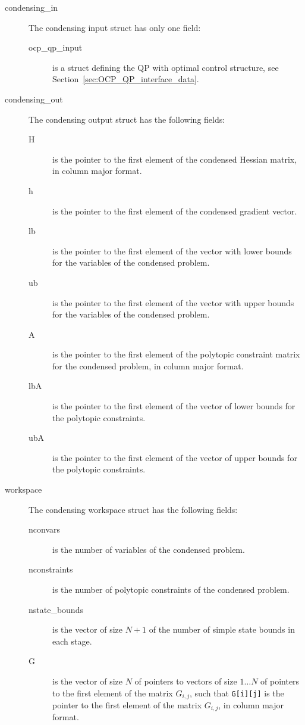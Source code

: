 \documentclass{report}
\begin{document}
\begin{description}
	\item[condensing\_in] The condensing input struct has only one field:
	\begin{description}
		\item[ocp\_qp\_input] is a struct defining the QP with optimal control structure, see Section~\ref{sec:OCP_QP_interface_data}.
	\end{description}
	\item[condensing\_out] The condensing output struct has the following fields:
	\begin{description}
		\item[H] is the pointer to the first element of the condensed Hessian matrix, in column major format.
		\item[h] is the pointer to the first element of the condensed gradient vector.
		\item[lb] is the pointer to the first element of the vector with lower bounds for the variables of the condensed problem.
		\item[ub] is the pointer to the first element of the vector with upper bounds for the variables of the condensed problem.
		\item[A] is the pointer to the first element of the polytopic constraint matrix for the condensed problem, in column major format.
		\item[lbA] is the pointer to the first element of the vector of lower bounds for the polytopic constraints.
		\item[ubA] is the pointer to the first element of the vector of upper bounds for the polytopic constraints.
	\end{description}
	\item[workspace] The condensing workspace struct has the following fields:
	\begin{description}
		\item[nconvars] is the number of variables of the condensed problem.
		\item[nconstraints] is the number of polytopic constraints of the condensed problem.
		\item[nstate\_bounds] is the vector of size $N+1$ of the number of simple state bounds in each stage.
		\item[G] is the vector of size $N$ of pointers to vectors of size $1 \ldots N$ of pointers to the first element of the matrix $G_{i,j}$, such that \texttt{G[i][j]} is the pointer to the first element of the matrix $G_{i,j}$, in column major format.

\end{description}
\end{description}
\end{document}
